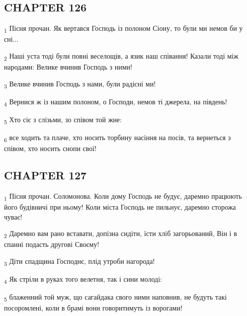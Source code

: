 \subsection{CHAPTER 126}
\begin{tcolorbox}
\textsubscript{1} Пісня прочан. Як вертався Господь із полоном Сіону, то були ми немов би у сні...
\end{tcolorbox}
\begin{tcolorbox}
\textsubscript{2} Наші уста тоді були повні веселощів, а язик наш співання! Казали тоді між народами: Велике вчинив Господь з ними!
\end{tcolorbox}
\begin{tcolorbox}
\textsubscript{3} Велике вчинив Господь з нами, були радісні ми!
\end{tcolorbox}
\begin{tcolorbox}
\textsubscript{4} Вернися ж із нашим полоном, о Господи, немов ті джерела, на південь!
\end{tcolorbox}
\begin{tcolorbox}
\textsubscript{5} Хто сіє з слізьми, зо співом той жне:
\end{tcolorbox}
\begin{tcolorbox}
\textsubscript{6} все ходить та плаче, хто носить торбину насіння на посів, та вернеться з співом, хто носить снопи свої!
\end{tcolorbox}
\subsection{CHAPTER 127}
\begin{tcolorbox}
\textsubscript{1} Пісня прочан. Соломонова. Коли дому Господь не будує, даремно працюють його будівничі при ньому! Коли міста Господь не пильнує, даремно сторожа чуває!
\end{tcolorbox}
\begin{tcolorbox}
\textsubscript{2} Даремно вам рано вставати, допізна сидіти, їсти хліб загорьований, Він і в спанні подасть другові Своєму!
\end{tcolorbox}
\begin{tcolorbox}
\textsubscript{3} Діти спадщина Господнє, плід утроби нагорода!
\end{tcolorbox}
\begin{tcolorbox}
\textsubscript{4} Як стріли в руках того велетня, так і сини молоді:
\end{tcolorbox}
\begin{tcolorbox}
\textsubscript{5} блаженний той муж, що сагайдака свого ними наповнив, не будуть такі посоромлені, коли в брамі вони говоритимуть із ворогами!
\end{tcolorbox}
